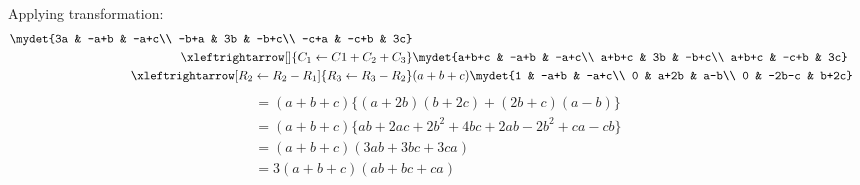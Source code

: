 Applying transformation:
\begin{align}
\mydet{3a & -a+b & -a+c\\
-b+a & 3b & -b+c\\
-c+a & -c+b & 3c}\\
\xleftrightarrow[]{C_1 \leftarrow C1+C_2+C_3 } 
&
\mydet{a+b+c & -a+b & -a+c\\
a+b+c & 3b & -b+c\\
a+b+c & -c+b & 3c}
\\
\xleftrightarrow[R_2 \leftarrow R_2-R_1]{R_3 \leftarrow R_3-R_2}
&
 (a+b+c)\mydet{1 & -a+b & -a+c\\
0 & a+2b & a-b\\
0 & -2b-c & b+2c}
\end{align}
\begin{multline}
=(a+b+c)\{(a+2b)(b+2c)+(2b+c)(a-b)\}\\
=(a+b+c)\{ab+2ac+2b^2+4bc+2ab-2b^2+ca-cb\}\\
=(a+b+c)(3ab+3bc+3ca)\\
=3(a+b+c)(ab+bc+ca)  
\end{multline}

